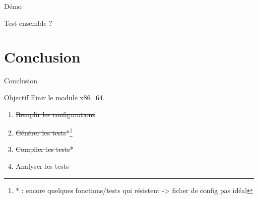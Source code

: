 \documentclass[A4,svgnames,9pt,aspectratio=169]{beamer}
\begin{document}
\begin{frame}{Démo}
  \begin{center}
    Test ensemble ?
  \end{center}
\end{frame}


\section{Conclusion}
\frame{\sectionpage}

\begin{frame}{Conclusion}
  \begin{block}{Objectif}
    Finir le module x86\_64.
  \end{block}

  \begin{enumerate}
    
    \item[{\makebox[0pt][l]{$\square$}\raisebox{.15ex}{\hspace{0.1em}$\checkmark$}}] \sout{Remplir les configurations}
    \item[{\makebox[0pt][l]{$\square$}\raisebox{.15ex}{\hspace{0.1em}$\checkmark$}}] \sout{Générer les tests}*\footnote{* : encore quelques fonctions/tests qui résistent -> ficher de config pas idéal}
    \item[{\makebox[0pt][l]{$\square$}\raisebox{.15ex}{\hspace{0.1em}$\checkmark$}}] \sout{Compiler les tests}*
    \item[{\makebox[0pt][l]{$\square$}\raisebox{.15ex}{\hspace{0.1em}$\checkmark$}}] Analyser les tests
  \end{enumerate}
  

\end{frame}


\frame{\merci}
\end{document}
